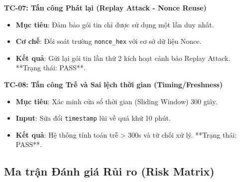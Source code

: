 \documentclass[11pt,a4paper]{article}
\begin{document}
\textbf{TC-07: Tấn công Phát lại (Replay Attack - Nonce Reuse)}
\begin{itemize}[noitemsep]
    \item \textbf{Mục tiêu}: Đảm bảo gói tin chỉ được sử dụng một lần duy nhất.
    \item \textbf{Cơ chế}: Đối soát trường \texttt{nonce\_hex} với cơ sở dữ liệu Nonce.
    \item \textbf{Kết quả}: Gửi lại gói tin lần thứ 2 kích hoạt cảnh bảo Replay Attack. **Trạng thái: PASS**.
\end{itemize}

\textbf{TC-08: Tấn công Trễ và Sai lệch thời gian (Timing/Freshness)}
\begin{itemize}[noitemsep]
    \item \textbf{Mục tiêu}: Xác minh cửa sổ thời gian (Sliding Window) 300 giây.
    \item \textbf{Input}: Sửa đổi \texttt{timestamp} lùi về quá khứ 10 phút.
    \item \textbf{Kết quả}: Hệ thống tính toán trễ > 300s và từ chối xử lý. **Trạng thái: PASS**.
\end{itemize}

\subsection{Ma trận Đánh giá Rủi ro (Risk Matrix)}
\begin{table}[H]
    \centering
    \caption{Ma trận Đánh giá Rủi ro và Chiến lược phòng thủ của Wallet}
\end{table}
\end{document}
